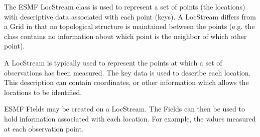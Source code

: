 %


The ESMF LocStream class is used to represent a set of points (the locations)
with descriptive data associated with each point (keys). A LocStream differs
from a Grid in that no topological structure is maintained between the points
(e.g. the class contains no information about which point is the neighbor
of which other point).

 A LocStream is typically used to represent the points at which a
set of observations has been measured. The key data is used to 
describe each location. This description can contain coordinates, or
other information which allows the locations to be identified. 

ESMF Fields may be created on a LocStream. The Fields can then be
used to hold information associated with each location. For example, 
the values measured at each observation point. 

